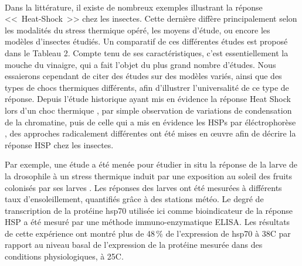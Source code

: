 		\paragraph*{}


		Dans la littérature, il existe de nombreux exemples illustrant la réponse <<~Heat-Shock~>> chez les insectes. Cette dernière diffère principalement selon les modalités du stress thermique opéré, les moyens d'étude,  ou encore les modèles d'insectes étudiés. Un comparatif de ces différentes études est proposé dans le Tableau 2.
		Compte tenu de ses caractéristiques, c'est essentiellement la mouche du vinaigre,  qui a fait l'objet du plus grand nombre d'études.
		Nous essaierons cependant de citer des études sur des modèles variés, ainsi que des types de chocs thermiques différents, afin d'illustrer l'universalité de ce type de réponse.
		Depuis l'étude historique ayant mis en évidence la réponse Heat Shock lors d'un choc thermique \cite{ritossa1996}, par simple observation de variations de condensation de la chromatine, puis de celle qui a mis en évidence les HSPs par éléctrophorèse \cite{tissieres1974}, 
		des approches radicalement différentes ont été mises en \oe{}uvre afin de décrire la réponse HSP chez les insectes.

		Par exemple, une étude a été menée pour étudier in situ la réponse de la larve de la drosophile à un stress thermique induit par une exposition au soleil des fruits colonisés par ses larves \cite{feder1997}.
		Les réponses des larves ont été mesurées à différents taux d'ensoleillement, quantifiés grâce à des stations météo.
		Le degré de transcription de la protéine hsp70 utilisée ici comme bioindicateur de la réponse HSP a été mesuré par une méthode immuno-enzymatique ELISA.
		Les résultats de cette expérience ont montré plus de 48\,\% de l'expression de hsp70 à 38\textdegree{}C par rapport au niveau basal de l'expression de la protéine mesurée dans des conditions physiologiques, à 25\textdegree{}C. 

